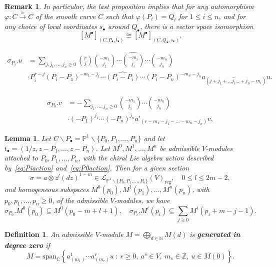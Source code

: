 \documentclass[10pt,a4paper]{amsart}
\newtheorem{remark}{Remark}
\newtheorem{lemma}{Lemma}
\newtheorem{definition}{Definition}
\newcommand{\C}{\mathbb{C}}
\newcommand{\N}{\mathbb{N}}
\renewcommand{\P}{\mathbb{P}}
\newcommand{\Z}{\mathbb{Z}}
\def\bs{\backslash}
\def\ds{\dots}
\def\o{\otimes}
\def\reg{\mathrm{reg}}
\def\si{\sigma}
\def\spn{\mathrm{span}}
\def\ssq{\subseteq}
\begin{document}
\begin{remark}\label{remark:coordinatefree}
    In particular, the last proposition implies that for any automorphism $\varphi: C\xrightarrow{\simeq} C$ of the smooth curve $C$ such that $\varphi(P_i)=Q_i$ for $1\leq i\leq n$, and for any choice of local coordinates $s_\bullet$ around $Q_\bullet$, there is a vector space isomorphism
\[
[M^\bullet]_{(C,P_\bullet,t_\bullet)}\cong [M^\bullet]_{(C,Q_\bullet,s_\bullet)}.
\]
\end{remark}

\begin{equation}\label{eq:Piaction}
    \begin{aligned}
\si_{P_i}.u&=  \sum_{j,j_1,\ds ,j_n\geq 0} \binom{r}{j}\binom{-m_1}{j_1}\cdots \widehat{\binom{-m_i}{j_i}}\cdots \binom{-m_n}{j_n} \\
 &\cdot P_i^{r-j} (P_i-P_1)^{-m_1-j_1}\cdots \widehat{(P_i-P_{i})}\cdots(P_i-P_n)^{-m_n-j_n} a_{(j+j_1+\ds\hat{j_i}\ds +j_n-m_i)}u.
    \end{aligned}
\end{equation}

\begin{equation}\label{eq:P0action}
    \begin{aligned}
\si_{P_0}.v&=  -\sum_{j_1,\ds ,j_n\geq 0}\binom{-m_1}{j_1}\cdots \binom{-m_n}{j_n} \\
 &\cdot  (-P_1)^{j_1}\cdots (-P_n)^{j_n} a'_{(r-m_1-j_1-\ds -m_n-j_n)}v,
    \end{aligned}
\end{equation}

\begin{lemma}\label{lm:regdegree}
Let $C\bs P_\bullet=\P^1\bs\{P_0,P_1,\ds ,P_n\}$ and let $t_\bullet=(1/z,z-P_1,\ds ,z-P_n)$. Let $M^0,M^1,\ds, M^n$ be admissible $V$-modules attached to $P_0,P_1,\ds,P_n$, with the chiral Lie algebra action described by~\eqref{eq:Piaction} and~\eqref{eq:P0action}. Then for a given section
\[
\si=a\o z^l (dz)^{1-m}\in \mathcal{L}_{\P^1\bs \{P_0,P_1,\ds ,P_n\}}(V)_\reg,\quad 0\leq l\leq 2m-2,
\]
and homogeneous subspaces $M^0(p_0),M^1(p_1),\ds, M^n(p_n)$, with $p_0,p_1,\ds,p_n\geq 0$, of the admissible $V$-modules, we have
\[
\si_{P_0}.M^0(p_0)\ssq M^0(p_0-m+l+1),\quad  \si_{P_i}.M^i(p_i)\ssq \sum_{j\geq 0}M^i(p_i+m-j-1).
\]

\end{lemma}

\begin{definition}\label{def:bottomgen}
An admissible $V$-module $M=\bigoplus_{d\in \N}M(d)$ is \textbf{generated in degree zero} if
\[
M=\spn_\C\left\{a^1_{(m_1)}\cdots a^r_{(m_r)}u\ :\ r\geq 0,\ a^s\in V,\ m_s\in \Z,\ u\in M(0)\right\}.
\]
\end{definition}
\end{document}
